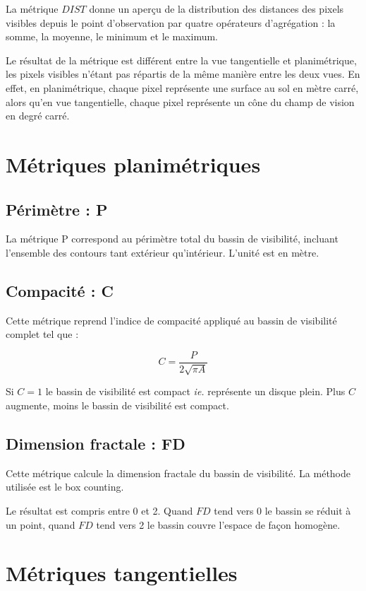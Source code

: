 \documentclass{report}
\begin{document}
La métrique $DIST$ donne un aperçu de la distribution des distances des pixels visibles depuis le point d'observation par quatre opérateurs d'agrégation : la somme, la moyenne, le minimum et le maximum.

Le résultat de la métrique est différent entre la vue tangentielle et planimétrique, les pixels visibles n'étant pas répartis de la même manière entre les deux vues. En effet, en planimétrique, chaque pixel représente une surface au sol en mètre carré, alors qu'en vue tangentielle, chaque pixel représente un cône du champ de vision en degré carré.


\section{Métriques planimétriques}

\subsection{Périmètre : P}

La métrique P correspond au périmètre total du bassin de visibilité, incluant l'ensemble des contours tant extérieur qu'intérieur. L'unité est en mètre.


\subsection{Compacité : C}
Cette métrique reprend l'indice de compacité appliqué au bassin de visibilité complet tel que :

$$C=\frac{P}{2\sqrt{\pi A}}$$

Si $C=1$ le bassin de visibilité est compact \textit{ie.} représente un disque plein. Plus $C$ augmente, moins le bassin de visibilité est compact.


\subsection{Dimension fractale : FD}
Cette métrique calcule la dimension fractale du bassin de visibilité. La méthode utilisée est le box counting.

Le résultat est compris entre 0 et 2. Quand $FD$ tend vers 0 le bassin se réduit à un point, quand $FD$ tend vers 2 le bassin couvre l'espace de façon homogène.

\section{Métriques tangentielles}
\end{document}
